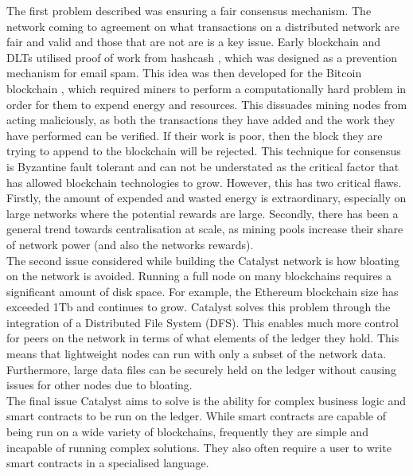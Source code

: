 The first problem described was ensuring a fair consensus mechanism. %
The network coming to agreement on what transactions on a distributed network are fair and valid and those that are not are is a key issue. Early blockchain and DLTs utilised proof of work from hashcash \cite{back2002hashcash}, which was designed as a prevention mechanism for email spam. This idea was then developed for the Bitcoin blockchain \cite{nakamoto2008bitcoin}, which required miners to perform a computationally hard problem in order for them to expend energy and  resources. This dissuades mining nodes from acting maliciously, as both the transactions they have added and the work they have performed can be verified. If their work is poor, then the block they are trying to append to the blockchain will be rejected. This technique for consensus is Byzantine fault tolerant and can not be understated as the critical factor that has allowed blockchain technologies to grow. However, this has two critical flaws. Firstly, the amount of expended and wasted energy is extraordinary, especially on large networks where the potential rewards are large. Secondly, there has been a general trend towards centralisation at scale, as mining pools increase their share of network power (and also the networks rewards). \\

The second issue considered while building the Catalyst network is how bloating on the network is avoided. Running a full node on many blockchains requires a significant amount of disk space. For example, the Ethereum blockchain size has exceeded 1Tb \cite{EthBloat} and continues to grow. Catalyst solves this problem through the integration of a Distributed File System (DFS). This enables much more control for peers on the network in terms of what elements of the ledger they hold. This means that lightweight nodes can run with only a subset of the network data. Furthermore, large data files can be securely held on the ledger without causing issues for other nodes due to bloating. \\

The final issue Catalyst aims to solve is the ability for complex business logic and smart contracts to be run on the ledger. While smart contracts are capable of being run on a wide variety of blockchains, frequently they are simple and incapable of running complex solutions. They also often require a user to write smart contracts in a specialised language. \\